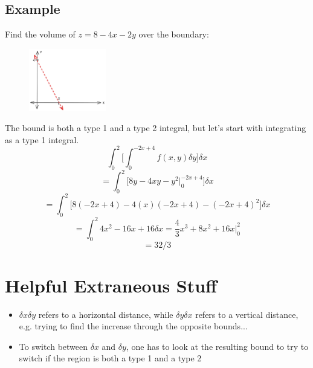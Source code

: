\documentclass{article}
\begin{document}
\subsection{Example}
Find the volume of $z = 8 - 4x - 2y$ over the boundary: 
\begin{figure}[H]
    \centering
    \includegraphics[width=0.3\textwidth]{figures/BoundedExample.png}
\end{figure}
The bound is both a type 1 and a type 2 integral, but let's start with integrating as a type 1 integral.
$$\int_{0}^{2} \big[\int_{0}^{-2x+4} f(x, y) \delta y\big] \delta x$$
$$= \int_{0}^{2} \big[8y - 4xy - y^2\big|_0^{-2x+4}\big] \delta x$$
$$= \int_{0}^{2} \big[8(-2x+4) - 4(x)(-2x+4) - (-2x+4)^2\big] \delta x$$
$$= \int_{0}^{2} 4x^2 - 16 x + 16 \delta x = \frac{4}{3} x^3 + 8x^2 + 16x \big|_0^2$$
$$ = \boxed{32/3}$$


\section{Helpful Extraneous Stuff}
\begin{itemize}
    \item $\delta x \delta y$ refers to a horizontal distance, while $\delta y \delta x$ refers to a vertical distance, e.g. trying to find the increase through the opposite bounds...
    \item To switch between $\delta x$ and $\delta y$, one has to look at the resulting bound to try to switch if the region is both a type 1 and a type 2
\end{itemize}
\end{document}
